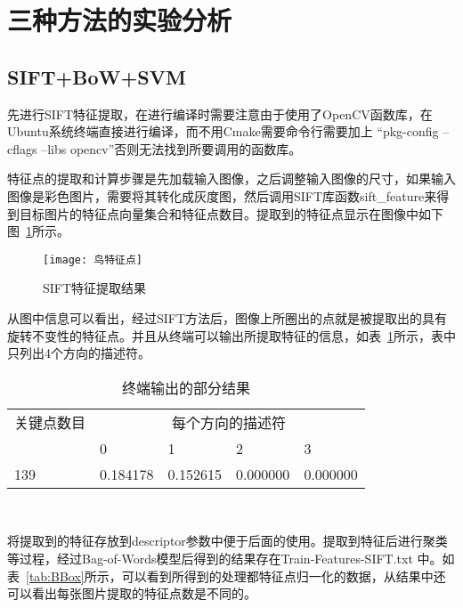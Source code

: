 \section{三种方法的实验分析}
\label{sec:shiyanfenxi}

\subsection{SIFT+BoW+SVM}
\label{subsec:siftbowsvm}
先进行SIFT特征提取，在进行编译时需要注意由于使用了OpenCV函数库，在Ubuntu系统终端直接进行编译，而不用Cmake需要命令行需要加上 “pkg-config –cflags –libs opencv”否则无法找到所要调用的函数库。

特征点的提取和计算步骤是先加载输入图像，之后调整输入图像的尺寸，如果输入图像是彩色图片，需要将其转化成灰度图，然后调用SIFT库函数sift\_feature来得到目标图片的特征点向量集合和特征点数目。提取到的特征点显示在图像中如下图~\ref{fig:siftfeature}所示。
\begin{figure}[H] %
  \centering
  \texttt{[image: 鸟特征点]}
  \caption{SIFT特征提取结果}
  \label{fig:siftfeature}
\end{figure}
从图中信息可以看出，经过SIFT方法后，图像上所圈出的点就是被提取出的具有旋转不变性的特征点。并且从终端可以输出所提取特征的信息，如表~\ref{tab:zhongduansift}所示，表中只列出4个方向的描述符。
\begin{table}[htbp]
  \centering
  \caption{终端输出的部分结果}
  \label{tab:zhongduansift}
    \begin{tabularx}{\linewidth}{l|X|X|X|X}
      \toprule[1.5pt]%
 \multicolumn{1}{c|}{关键点数目} & \multicolumn{4}{c}{每个方向的描述符}\\\cline{2-5}
      & 0 & 1 & 2 & 3 \\ \hline
      139  & 0.184178 & 0.152615 & 0.000000 & 0.000000 \\ 
     \bottomrule[1.5pt]
    \end{tabularx}\\[2pt]
\end{table}
  
将提取到的特征存放到descriptor参数中便于后面的使用。提取到特征后进行聚类等过程，经过Bag-of-Words模型后得到的结果存在Train-Features-SIFT.txt 中。如表~\ref{tab:BBox}所示，可以看到所得到的处理都特征点归一化的数据，从结果中还可以看出每张图片提取的特征点数是不同的。

